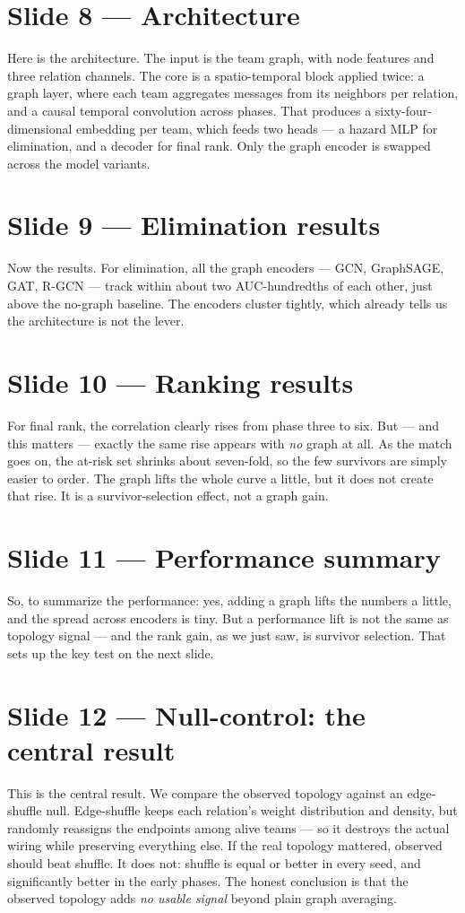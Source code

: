 \documentclass[11pt]{article}
\begin{document}
\section{Slide 8 --- Architecture}
Here is the architecture. The input is the team graph, with node features and three relation channels. The core is a spatio-temporal block applied twice: a graph layer, where each team aggregates messages from its neighbors per relation, and a causal temporal convolution across phases. That produces a sixty-four-dimensional embedding per team, which feeds two heads --- a hazard MLP for elimination, and a decoder for final rank. Only the graph encoder is swapped across the model variants.

\section{Slide 9 --- Elimination results}
Now the results. For elimination, all the graph encoders --- GCN, GraphSAGE, GAT, R-GCN --- track within about two AUC-hundredths of each other, just above the no-graph baseline. The encoders cluster tightly, which already tells us the architecture is not the lever.

\section{Slide 10 --- Ranking results}
For final rank, the correlation clearly rises from phase three to six. But --- and this matters --- exactly the same rise appears with \emph{no} graph at all. As the match goes on, the at-risk set shrinks about seven-fold, so the few survivors are simply easier to order. The graph lifts the whole curve a little, but it does not create that rise. It is a survivor-selection effect, not a graph gain.

\section{Slide 11 --- Performance summary}
So, to summarize the performance: yes, adding a graph lifts the numbers a little, and the spread across encoders is tiny. But a performance lift is not the same as topology signal --- and the rank gain, as we just saw, is survivor selection. That sets up the key test on the next slide.

\section{Slide 12 --- Null-control: the central result}
This is the central result. We compare the observed topology against an edge-shuffle null. Edge-shuffle keeps each relation's weight distribution and density, but randomly reassigns the endpoints among alive teams --- so it destroys the actual wiring while preserving everything else. If the real topology mattered, observed should beat shuffle. It does not: shuffle is equal or better in every seed, and significantly better in the early phases. The honest conclusion is that the observed topology adds \emph{no usable signal} beyond plain graph averaging.
\end{document}
